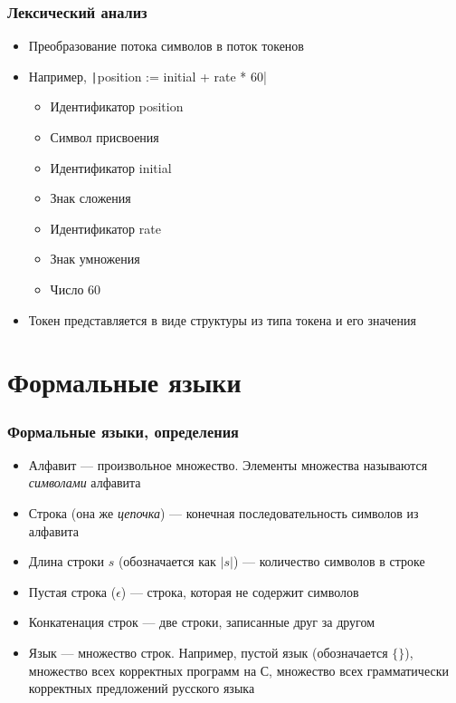 \documentclass{../../slides-style}
\begin{document}
    \begin{frame}
        \frametitle{Лексический анализ}
        \begin{itemize}
            \item Преобразование потока символов в поток токенов
            \item Например, \texttt|position := initial + rate * 60|
            \begin{itemize}
                \item Идентификатор position
                \item Символ присвоения
                \item Идентификатор initial
                \item Знак сложения
                \item Идентификатор rate
                \item Знак умножения
                \item Число 60
            \end{itemize}
            \item Токен представляется в виде структуры из типа токена и его значения
        \end{itemize}
    \end{frame}

    \section{Формальные языки}

    \begin{frame}
        \frametitle{Формальные языки, определения}
        \begin{itemize}
            \item Алфавит --- произвольное множество. Элементы множества называются \textit{символами} алфавита
            \item Строка (она же \textit{цепочка}) --- конечная последовательность символов из алфавита
            \item Длина строки $s$ (обозначается как $\lvert{s}\rvert$) --- количество символов в строке
            \item Пустая строка ($\epsilon$) --- строка, которая не содержит символов
            \item Конкатенация строк --- две строки, записанные друг за другом
            \item Язык --- множество строк. Например, пустой язык (обозначается $\{\}$), множество всех корректных 
                программ на С, множество всех грамматически корректных предложений русского языка
        \end{itemize}
    \end{frame}
\end{document}
